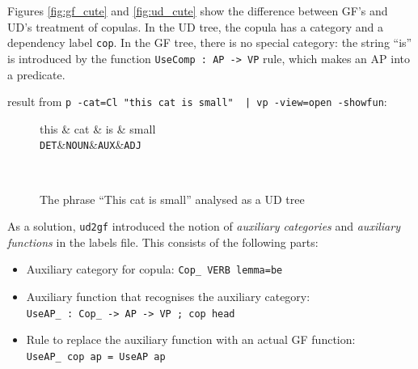 Figures \ref{fig:gf_cute} and \ref{fig:ud_cute} show the difference between GF’s and UD’s treatment of copulas. In the UD tree, the copula has a category and a dependency label \verb|cop|. In the GF tree, there is no special category: the string “is” is introduced by the function \verb|UseComp : AP -> VP| rule, which makes an AP into a predicate.


result from \verb+p -cat=Cl "this cat is small"  | vp -view=open -showfun+:


\begin{figure}
    \centering
    \begin{dependency}
       \begin{deptext}[column sep=0.4cm]
             this \& cat \& is \& small \\
           {\tt DET}\&{\tt NOUN}\&{\tt AUX}\&{\tt ADJ}\\
       \end{deptext}
    \end{dependency} \\
    \caption{The phrase ``This cat is small'' analysed as a UD tree}
    \label{fig:enter-label}
\end{figure}

As a solution, \verb|ud2gf| introduced the notion of \emph{auxiliary categories} and \emph{auxiliary functions} in the labels file. This consists of the following parts:
\begin{itemize}
    \item Auxiliary category for copula: \verb|Cop_ VERB lemma=be|
    \item Auxiliary function that recognises the auxiliary category: \\
           \verb|UseAP_ : Cop_ -> AP -> VP ; cop head|
    \item Rule to replace the auxiliary function with an actual GF function: \\
          \verb|UseAP_ cop ap = UseAP ap|
\end{itemize}


